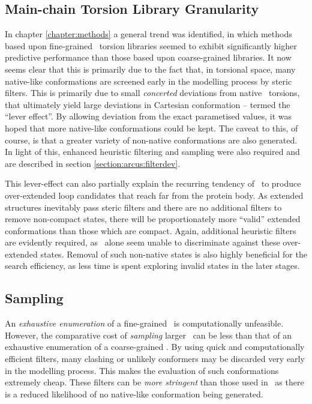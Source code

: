\subsection{Main-chain Torsion Library Granularity}

In chapter \ref{chapter:methods}
a general trend was identified, in which methods based upon fine-grained \mainchain\ torsion libraries seemed to exhibit significantly higher predictive performance than those based upon coarse-grained libraries. It now seems clear that this is primarily due to the fact that, in torsional space, many native-like conformations  are screened  early in the modelling process by steric filters. This is primarily due to small \emph{concerted} deviations from native \mainchain\ torsions, that ultimately yield large deviations in Cartesian conformation -- termed the ``lever effect''. By allowing deviation from the exact parametised values, it was hoped that more native-like conformations could be kept. The caveat to this, of course, is that a greater variety of non-native conformations are also generated. In light of this, enhanced heuristic filtering and sampling were also required and are described in section \ref{section:arcus:filterdev}.

This lever-effect can also partially explain the recurring tendency of \prearcus\ to produce over-extended loop candidates that reach far from the protein body. As extended structures inevitably pass steric filters and there are no additional filters to remove non-compact states, there will be proportionately more ``valid'' extended conformations than those which are compact. Again, additional heuristic filters are evidently required, as \ambergbsa\ alone seem unable to discriminate against these over-extended states.
Removal of such non-native states is also highly beneficial for the search efficiency, as less time is spent exploring invalid states in the later stages.
\subsection{Sampling}

An \emph{exhaustive enumeration} of a fine-grained \angleset\ is computationally unfeasible. However, the comparative cost of \emph{sampling} larger \anglesets\ can be less than that of an exhaustive enumeration of a coarse-grained \angleset. By using quick and computationally efficient filters, many clashing or unlikely conformers may be discarded very early in the modelling process. This makes the evaluation of such conformations extremely cheap.
These filters can be \emph{more stringent} than those used in \prearcus\ as there is a reduced likelihood of no native-like conformation being generated.

